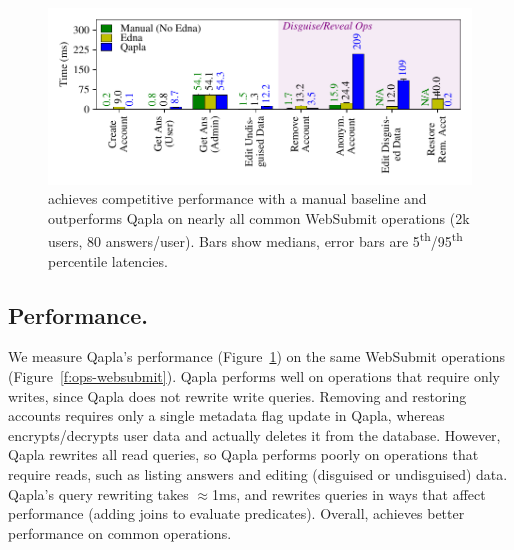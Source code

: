 %
\begin{figure}[t]
  \centering
      \includegraphics[width=\columnwidth]{figs/websubmit_qapla_op_stats}
    \caption{\sys achieves competitive performance with a manual baseline and
    outperforms Qapla on nearly all common WebSubmit operations (2k users,
    80 answers/user).
    Bars show medians, error bars are 5\textsuperscript{th}/95\textsuperscript{th}
    percentile latencies.}
  \label{f:qapla_ws_opstats}
\end{figure}

%
\subsection{Performance.}
\label{s:eval-qapla-perf}
%
We measure Qapla's performance (Figure~\ref{f:qapla_ws_opstats}) on the same
WebSubmit operations (Figure~\ref{f:ops-websubmit}).
%
Qapla performs well on operations that require only writes, since Qapla does not
rewrite write queries.  Removing and restoring accounts requires only a single
metadata flag update in Qapla, whereas \sys encrypts/decrypts user data and
actually deletes it from the database.
%
However, Qapla rewrites all read queries, so Qapla performs poorly on operations
that require reads, such as listing answers and editing (disguised or
undisguised) data.
%
Qapla's query rewriting takes $\approx$1ms, and rewrites  queries in
ways that affect performance (\eg adding joins to evaluate predicates).
%
Overall, \sys achieves better performance on common operations.

%

